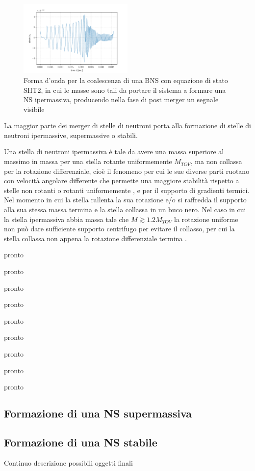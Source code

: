 \begin{figure}
	\vspace{-20pt}
	\begin{center}
		\includegraphics[width=0.5\textwidth]{figures/Capitolo_1/SHT2.0.pdf}
	\end{center}
	\vspace{-10pt}
	\caption{Forma d'onda per la coalescenza di una BNS con equazione di stato SHT2, in cui le masse sono tali da portare il sistema a formare una NS ipermassiva, producendo nella fase di post merger un segnale visibile}
	\label{fig:FormaOndaToNS}
	\vspace{-20pt}
\end{figure}

La maggior parte dei merger di stelle di neutroni porta alla formazione di stelle di neutroni ipermassive, supermassive o stabili. 

Una stella di neutroni ipermassiva è tale da avere una massa superiore al massimo in massa per una stella rotante uniformemente $M_{TOV}$, ma non collassa per la rotazione differenziale, cioè il fenomeno per cui le sue diverse parti ruotano con velocità angolare differente che permette una maggiore stabilità rispetto a stelle non rotanti o rotanti uniformemente \cite{Baumgarte_2000}, e per il supporto di gradienti termici. Nel momento in cui la stella rallenta la sua rotazione e/o si raffredda il supporto alla sua stessa massa termina e la stella collassa in un buco nero. 
Nel caso in cui la stella ipermassiva abbia massa tale che $M \gtrsim 1.2 M_{TOV}$ la rotazione uniforme non può dare sufficiente supporto centrifugo per evitare il collasso, per cui la stella collassa non appena la rotazione differenziale termina \cite{sarin2020evolution}.



pronto
	
pronto

pronto

pronto

pronto

pronto

pronto

pronto

pronto

\subsection{Formazione di una NS supermassiva}
\subsection{Formazione di una NS stabile}
Continuo descrizione possibili oggetti finali\cite{sarin2020evolution}
